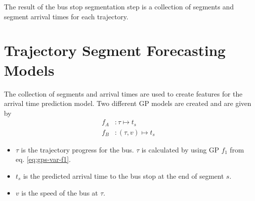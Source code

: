 The result of the bus stop segmentation step is a collection of segments and segment arrival times for each trajectory.

\section{Trajectory Segment Forecasting Models}
The collection of segments and arrival times are used to create features for the arrival time prediction model.
Two different GP models are created and are given by
\begin{align}
    f_A&: \tau \mapsto t_s \label{eq:f_A} \\
    f_B&: (\tau, v) \mapsto t_s \label{eq:f_B}
\end{align}
\begin{itemize}
    \item $\tau$ is the trajectory progress for the bus. $\tau$ is calculated by using GP $f_1$ from eq. \ref{eq:gps-var-f1}.
    \item $t_s$ is the predicted arrival time to the bus stop at the end of segment $s$.
    \item $v$ is the speed of the bus at $\tau$. 
\end{itemize}  

